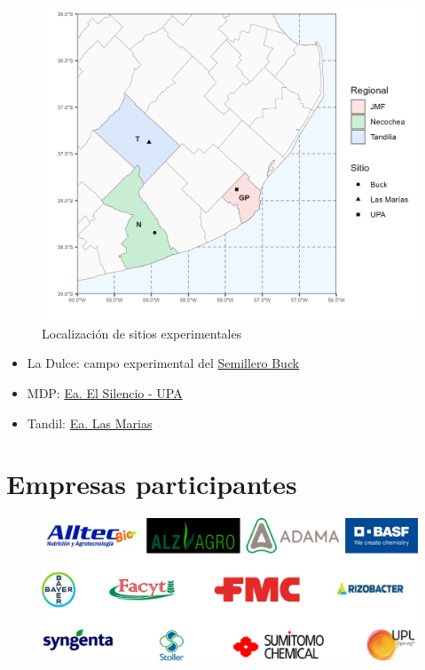 \documentclass[
  letterpaper,
  DIV=11,
  numbers=noendperiod]{scrreprt}
\begin{document}
\begin{figure}

{\centering \includegraphics{./plots/mapa_sitios.png}

}

\caption{Localización de sitios experimentales}

\end{figure}

\begin{itemize}
\item
  La Dulce: campo experimental del
  \href{https://maps.app.goo.gl/KsM2nnVsr1KpPx356}{Semillero Buck}
\item
  MDP: \href{https://goo.gl/maps/b9GsTpwBpxScjFA26}{Ea. El Silencio -
  UPA}
\item
  Tandil: \href{https://maps.app.goo.gl/MKWH8AD4Me75CP1DA}{Ea. Las
  Marias}
\end{itemize}

\hypertarget{empresas-participantes}{%
\section*{Empresas participantes}\label{empresas-participantes}}


\begin{figure}

{\centering \includegraphics{./figs/patrocinantes.png}

}

\end{figure}
\end{document}
